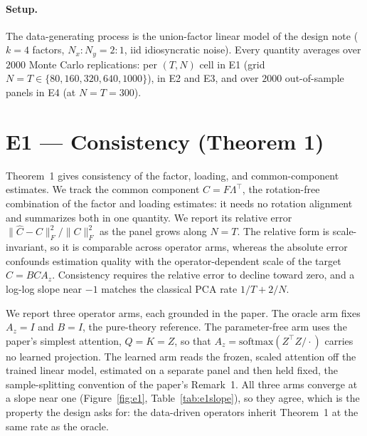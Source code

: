 \documentclass[11pt]{article}
\begin{document}
\paragraph{Setup.} The data-generating process is the union-factor linear model of the design
note ($k=4$ factors, $N_x{:}N_y=2{:}1$, iid idiosyncratic noise). Every quantity averages over
$2000$ Monte Carlo replications: per $(T,N)$ cell in E1 (grid $N=T\in\{80,160,320,640,1000\}$), in
E2 and E3, and over $2000$ out-of-sample panels in E4 (at $N=T=300$).

\section{E1 --- Consistency (Theorem 1)}
Theorem~1 gives consistency of the factor, loading, and common-component estimates. We track the
common component $C=F\Lambda^\top$, the rotation-free combination of the factor and loading
estimates: it needs no rotation alignment and summarizes both in one quantity. We report its
relative error $\|\widehat C - C\|_F^2/\|C\|_F^2$ as the panel grows along $N=T$. The relative form
is scale-invariant, so it is comparable across operator arms, whereas the absolute error confounds
estimation quality with the operator-dependent scale of the target $C=BCA_z$. Consistency requires
the relative error to decline toward zero, and a log-log slope near $-1$ matches the classical PCA
rate $1/T+2/N$.

We report three operator arms, each grounded in the paper. The oracle arm fixes $A_z=I$ and $B=I$,
the pure-theory reference. The parameter-free arm uses the paper's simplest attention, $Q=K=Z$, so
that $A_z=\mathrm{softmax}(Z^\top Z/\cdot)$ carries no learned projection. The learned arm reads the
frozen, scaled attention off the trained linear model, estimated on a separate panel and then held
fixed, the sample-splitting convention of the paper's Remark~1. All three arms converge at a slope
near one (Figure~\ref{fig:e1}, Table~\ref{tab:e1slope}), so they agree, which is the property the
design asks for: the data-driven operators inherit Theorem~1 at the same rate as the oracle.
\end{document}

